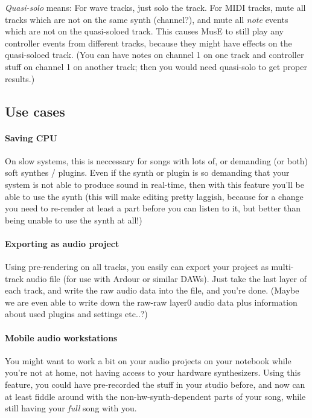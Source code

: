 \documentclass[a4paper]{report}
\begin{document}
\emph{Quasi-solo} means: For wave tracks, just solo the track. For MIDI
tracks, mute all tracks which are not on the same synth (channel?),
and mute all \emph{note} events which are not on the quasi-soloed track.
This causes MusE to still play any controller events from different
tracks, because they might have effects on the quasi-soloed track. (You
can have notes on channel 1 on one track and controller stuff on channel
1 on another track; then you would need quasi-solo to get proper results.)

\subsection{Use cases}
\paragraph{Saving CPU}
On slow systems, this is neccessary for songs with lots of, or demanding
(or both) soft synthes / plugins. Even if the synth or plugin is so
demanding that your system is not able to produce sound in real-time,
then with this feature you'll be able to use the synth (this will make
editing pretty laggish, because for a change you need to re-render at
least a part before you can listen to it, but better than being unable
to use the synth at all!)

\paragraph{Exporting as audio project}
Using pre-rendering on all tracks, you easily can export your project
as multi-track audio file (for use with Ardour or similar DAWs).
Just take the last layer of each track, and write the raw audio data
into the file, and you're done. (Maybe we are even able to write down
the raw-raw layer0 audio data plus information about used plugins and
settings etc..?)

\paragraph{Mobile audio workstations}
You might want to work a bit on your audio projects on your notebook
while you're not at home, not having access to your hardware synthesizers.
Using this feature, you could have pre-recorded the stuff in your studio
before, and now can at least fiddle around with the non-hw-synth-dependent
parts of your song, while still having your \emph{full} song with you.
\end{document}
